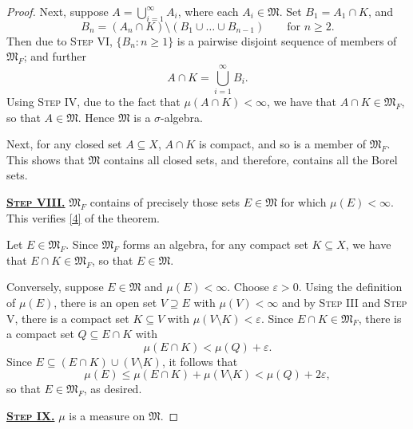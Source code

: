 \documentclass[11pt]{article}
\theoremstyle{thmstyle}
\theoremstyle{defstyle}
\newcommand{\frakM}{\mathfrak{M}} %
\renewcommand{\le}{\leqslant}
\renewcommand{\ge}{\geqslant}
\begin{document}
\begin{proof}
    Next, suppose $\displaystyle A = \bigcup_{i = 1}^\infty A_i$, where each $A_i\in\frakM$. Set $B_1 = A_1\cap K$, and 
    \begin{equation*}
        B_n = (A_n\cap K)\setminus (B_1\cup\dots\cup B_{n - 1})\qquad\text{for }n\ge 2.
    \end{equation*}
    Then due to \textsc{Step VI}, $\{B_n\colon n\ge 1\}$ is a pairwise disjoint sequence of members of $\frakM_F$; and further 
    \begin{equation*}
        A\cap K = \bigcup_{i = 1}^\infty B_i.
    \end{equation*}
    Using \textsc{Step IV}, due to the fact that $\mu(A\cap K) < \infty$, we have that $A\cap K\in\frakM_F$, so that $A\in\frakM$. Hence $\frakM$ is a $\sigma$-algebra.

    Next, for any closed set $A\subseteq X$, $A\cap K$ is compact, and so is a member of $\frakM_F$. This shows that $\frakM$ contains all closed sets, and therefore, contains all the Borel sets.

    \vspace{0.5cm}

    \noindent\underline{\textbf{\textsc{Step VIII.}}} $\frakM_F$ contains of precisely those sets $E\in\frakM$ for which $\mu(E) < \infty$. This verifies \ref{4} of the theorem.

    Let $E\in\frakM_F$. Since $\frakM_F$ forms an algebra, for any compact set $K\subseteq X$, we have that $E\cap K\in\frakM_F$, so that $E\in\frakM$.

    Conversely, suppose $E\in\frakM$ and $\mu(E) < \infty$. Choose $\varepsilon > 0$. Using the definition of $\mu(E)$, there is an open set $V\supseteq E$ with $\mu(V) < \infty$ and by \textsc{Step III} and \textsc{Step V}, there is a compact set $K\subseteq V$ with $\mu(V\setminus K) < \varepsilon$. Since $E\cap K\in\frakM_F$, there is a compact set $Q\subseteq E\cap K$ with 
    \begin{equation*}
        \mu(E\cap K) < \mu(Q) + \varepsilon.
    \end{equation*}
    Since $E\subseteq (E\cap K)\cup (V\setminus K)$, it follows that 
    \begin{equation*}
        \mu(E) \le \mu(E\cap K) + \mu(V\setminus K) < \mu(Q) + 2\varepsilon,
    \end{equation*}
    so that $E\in\frakM_F$, as desired.

    \vspace{0.5cm}

    \noindent\underline{\textbf{\textsc{Step IX.}}} $\mu$ is a measure on $\frakM$.


\end{proof}
\end{document}

